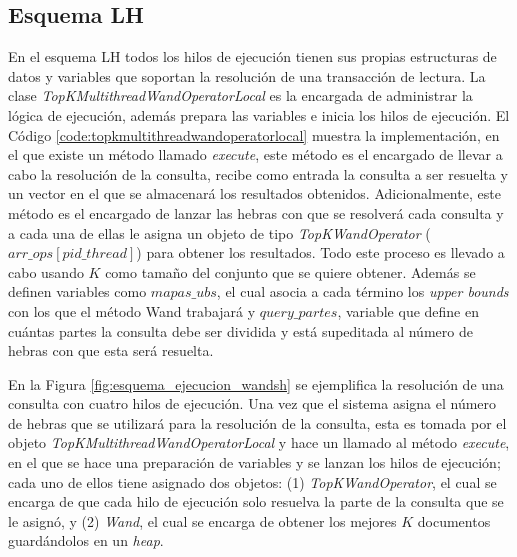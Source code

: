 \subsection{Esquema LH}
\label{evaluacionexperimental:esquemalh}
En el esquema LH todos los hilos de ejecución tienen sus propias estructuras de datos y variables que soportan la resolución de una transacción de lectura. La clase \textit{TopKMultithreadWandOperatorLocal} es la encargada de administrar la lógica de ejecución, además prepara las variables e inicia los hilos de ejecución. El Código \ref{code:topkmultithreadwandoperatorlocal} muestra la implementación, en el que existe un método llamado \textit{execute}, este método es el encargado de llevar a cabo la resolución de la consulta, recibe como entrada la consulta a ser resuelta y un vector en el que se almacenará los resultados obtenidos. Adicionalmente, este método es el encargado de lanzar las hebras con que se resolverá cada consulta y a cada una de ellas le asigna un objeto de tipo \textit{TopKWandOperator} ($arr\_ops[pid\_thread]$) para obtener los resultados. Todo este proceso es llevado a cabo usando $K$ como tamaño del conjunto que se quiere obtener. Además se definen variables como \textit{$mapas\_ubs$}, el cual asocia a cada término los \textit{upper bounds} con los que el método Wand trabajará y \textit{$query\_partes$}, variable que define en cuántas partes la consulta debe ser dividida y está supeditada al número de hebras con que esta será resuelta.



En la Figura \ref{fig:esquema_ejecucion_wandsh} se ejemplifica la resolución de una consulta con cuatro hilos de ejecución. Una vez que el sistema asigna el número de hebras que se utilizará para la resolución de la consulta, esta es tomada por el objeto \textit{TopKMultithreadWandOperatorLocal} y hace un llamado al método \textit{execute}, en el que se hace una preparación de variables y se lanzan los hilos de ejecución; cada uno de ellos tiene asignado dos objetos: (1) \textit{TopKWandOperator}, el cual se encarga de que cada hilo de ejecución solo resuelva la parte de la consulta que se le asignó, y (2) \textit{Wand}, el cual se encarga de obtener los mejores $K$ documentos guardándolos en un \textit{heap}.

